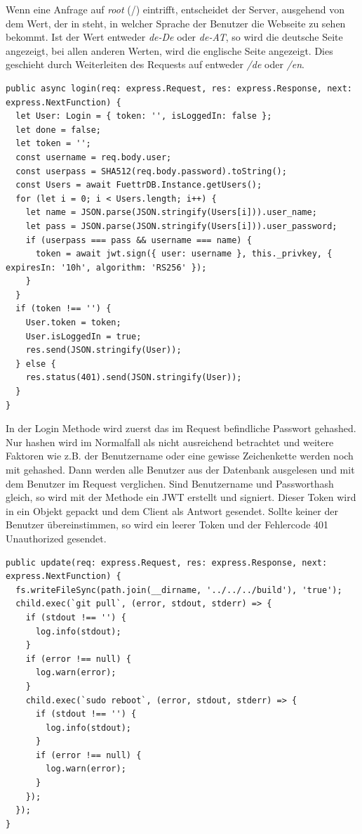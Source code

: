Wenn eine Anfrage auf \textit{root} (/) eintrifft, entscheidet der Server, ausgehend von dem Wert, der in  steht, in welcher Sprache der Benutzer die Webseite zu sehen bekommt. Ist der Wert entweder \textit{de-De} oder \textit{de-AT}, so wird die deutsche Seite angezeigt, bei allen anderen Werten, wird die englische Seite angezeigt. Dies geschieht durch Weiterleiten des Requests auf entweder \textit{/de} oder \textit{/en}. 

\begin{lstlisting}[style=TS,caption=Login Methode,label=login]
public async login(req: express.Request, res: express.Response, next: express.NextFunction) {
  let User: Login = { token: '', isLoggedIn: false };
  let done = false;
  let token = '';
  const username = req.body.user;
  const userpass = SHA512(req.body.password).toString();
  const Users = await FuettrDB.Instance.getUsers();
  for (let i = 0; i < Users.length; i++) {
    let name = JSON.parse(JSON.stringify(Users[i])).user_name;
    let pass = JSON.parse(JSON.stringify(Users[i])).user_password;
    if (userpass === pass && username === name) {
      token = await jwt.sign({ user: username }, this._privkey, { expiresIn: '10h', algorithm: 'RS256' });
    }
  }
  if (token !== '') {
    User.token = token;
    User.isLoggedIn = true;
    res.send(JSON.stringify(User));
  } else {
    res.status(401).send(JSON.stringify(User));
  }
}
\end{lstlisting}

In der Login Methode wird zuerst das im Request befindliche Passwort gehashed. Nur hashen wird im Normalfall als nicht ausreichend betrachtet und weitere Faktoren wie z.B. der Benutzername oder eine gewisse Zeichenkette werden noch mit gehashed. Dann werden alle Benutzer aus der Datenbank ausgelesen und mit dem Benutzer im Request verglichen. Sind Benutzername und Passworthash gleich, so wird mit der Methode  ein \ac{JWT} erstellt und signiert. Dieser Token wird in ein Objekt gepackt und dem Client als Antwort gesendet. Sollte keiner der Benutzer übereinstimmen, so wird ein leerer Token und der Fehlercode 401 Unauthorized gesendet.

\begin{lstlisting}[caption=Update Methode,label=update methode,style=TS]
public update(req: express.Request, res: express.Response, next: express.NextFunction) {
  fs.writeFileSync(path.join(__dirname, '../../../build'), 'true');
  child.exec(`git pull`, (error, stdout, stderr) => {
    if (stdout !== '') {
      log.info(stdout);
    }
    if (error !== null) {
      log.warn(error);
    }
    child.exec(`sudo reboot`, (error, stdout, stderr) => {
      if (stdout !== '') {
        log.info(stdout);
      }
      if (error !== null) {
        log.warn(error);
      }
    });
  });
}
\end{lstlisting}


